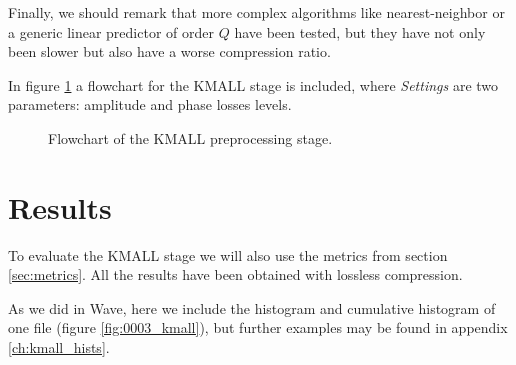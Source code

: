 Finally, we should remark that more complex algorithms like nearest-neighbor or a generic linear predictor of order $Q$ have been tested, but they have not only been slower but also have a worse compression ratio.

\pagebreak
In figure \ref{fig:kmall_flowchart} a flowchart for the KMALL stage is included, where \textit{Settings} are two parameters: amplitude and phase losses levels.

\begin{figure}[h!]
	\begin{center}
		\scalebox{.95}{}
	\end{center}
	\caption{Flowchart of the KMALL preprocessing stage.}
	\label{fig:kmall_flowchart}
\end{figure}

\section{Results}
To evaluate the KMALL stage we will also use the metrics from section \ref{sec:metrics}. All the results have been obtained with lossless compression.

As we did in Wave, here we include the histogram and cumulative histogram of one file (figure \ref{fig:0003_kmall}), but further examples may be found in appendix \ref{ch:kmall_hists}.

